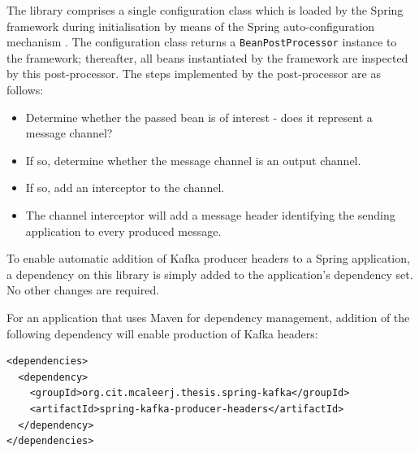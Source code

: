  The library comprises a single configuration class which is loaded by the Spring framework during initialisation by means of the Spring auto-configuration mechanism \cite{SpringFactories}. The configuration class returns a \texttt{BeanPostProcessor} instance to the framework; thereafter, all beans instantiated by the framework are inspected by this post-processor. The steps implemented by the post-processor are as follows:
 
 \begin{itemize}
  	\item Determine whether the passed bean is of interest - does it represent a message channel?
  	\item If so, determine whether the message channel is an output channel.
  	\item If so, add an interceptor to the channel. 
  	\item The channel interceptor will add a message header identifying the sending application to every produced message.
 \end{itemize}

To enable automatic addition of Kafka producer headers to a Spring application, a dependency on this library is simply added to the application's dependency set. No other changes are required.

For an application that uses Maven for dependency management, addition of the following dependency will enable production of Kafka headers:

\vspace{5mm}

\begin{lstlisting}[caption={Maven dependency on spring-kafka-producer-headers},captionpos=b]
<dependencies>
  <dependency>
    <groupId>org.cit.mcaleerj.thesis.spring-kafka</groupId>
    <artifactId>spring-kafka-producer-headers</artifactId>  
  </dependency>
</dependencies>
\end{lstlisting}


 